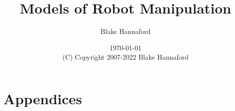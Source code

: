 \documentclass[oneside]{book}
\begin{document}
\setpagewiselinenumbers
\modulolinenumbers[5]

\setcounter{chapter}{0}



 \title{Models of Robot Manipulation}

 \author{Blake Hannaford}

 \date{\today\\(C) Copyright 2007-2022 Blake Hannaford}

 \maketitle

\tableofcontents

\mainmatter

\linenumbers

 
%
%

\part{Appendices}
\appendix



%
\label{LastPage}
\end{document}
